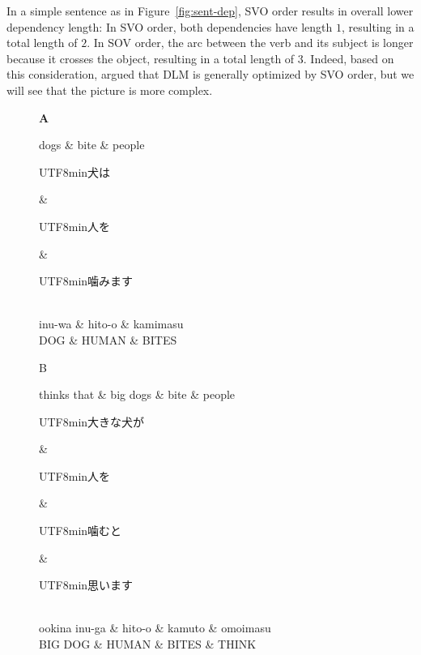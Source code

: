 \documentclass[11pt,a4paper]{article}
\newcommand{\japanese}[1]{\begin{CJK}{UTF8}{min}#1\end{CJK}}
\begin{document}
In a simple sentence as in Figure~\ref{fig:sent-dep}, SVO order results in overall lower dependency length:
In SVO order, both dependencies have length $1$, resulting in a total length of $2$.
In SOV order, the arc between the verb and its subject is longer because it crosses the object, resulting in a total length of $3$.
Indeed, based on this consideration, \cite{ferrer-i-cancho-placement-2017} argued that DLM is generally optimized by SVO order, but we will see that the picture is more complex.


\begin{figure}
\textbf{A}
\begin{dependency}[theme = simple]
   \begin{deptext}[column sep=1em]
          dogs \& bite \& people  \\
   \end{deptext}
\end{dependency}
\begin{dependency}[theme = simple]
   \begin{deptext}[column sep=1em]
   \japanese{犬は} \& \japanese{人を} \& \japanese{噛みます}\\ 
   inu-wa \& hito-o \& kamimasu \\
          DOG \& HUMAN \& BITES  \\
   \end{deptext}
\end{dependency}

B
\begin{dependency}[theme = simple]
   \begin{deptext}[column sep=1em]
       thinks that \& big dogs \& bite \& people  \\
   \end{deptext}
\end{dependency}
\begin{dependency}[theme = simple]
   \begin{deptext}[column sep=1em]
   \japanese{大きな犬が} \& \japanese{人を} \& \japanese{噛むと} \& \japanese{思います}\\ 
   ookina inu-ga \& hito-o \& kamuto \& omoimasu \\
         BIG DOG \& HUMAN \& BITES \& THINK \\
   \end{deptext}
\end{dependency}


\end{figure}
\end{document}
